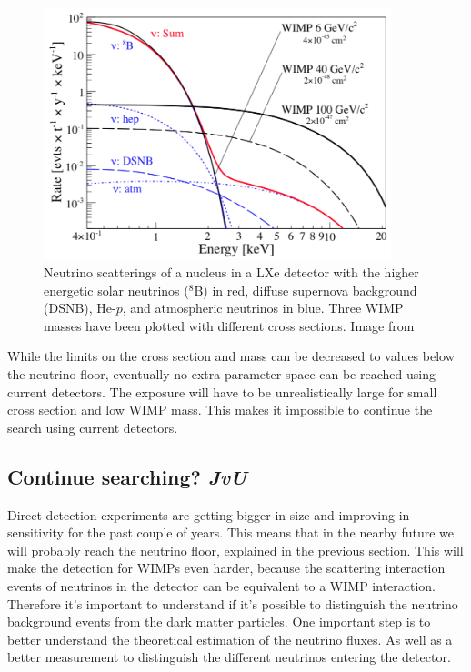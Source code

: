 \documentclass{article}
\begin{document}
\begin{figure}[h!]
    \centering
    \includegraphics[width=0.9\textwidth]{Nuclear_neutrino.png}
    \caption{Neutrino scatterings of a nucleus in a LXe detector with the higher energetic solar neutrinos (${}^8$B) in red, diffuse supernova background (DSNB), He-$p$, and atmospheric neutrinos in blue. Three WIMP masses have been plotted with different cross sections. Image from \cite{Baudis:2013qla}}
    \label{fig:nuclear_neutrino}
\end{figure}

While the limits on the cross section and mass can be decreased to values below the neutrino floor, eventually no extra parameter space can be reached using current detectors. The exposure will have to be unrealistically large for small cross section and low WIMP mass. This makes it impossible to continue the search using current detectors.

\subsection{Continue searching? \small{\textit{JvU}}}
Direct detection experiments are getting bigger in size and improving in sensitivity for the past couple of years. This means that in the nearby future we will probably reach the neutrino floor, explained in the previous section. This will make the detection for WIMPs even harder, because the scattering interaction events of neutrinos in the detector can be equivalent to a WIMP interaction. Therefore  it's important to understand if it's possible to distinguish the neutrino background events from the dark matter particles. One important step is to better understand the theoretical estimation of the neutrino fluxes. As well as a better measurement to distinguish the different neutrinos entering the detector. 
\end{document}
